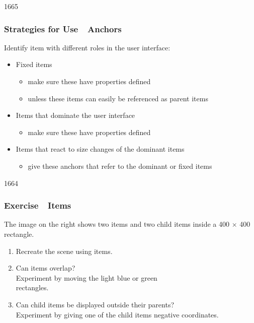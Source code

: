 
\begin{slide}{1665}\frametitle{Strategies for Use~\textendash~Anchors}

Identify item with different roles in the user interface:

\begin{itemize}
\item Fixed items
  \begin{itemize}
  \item make sure these have  properties defined
  \item unless these items can easily be referenced as parent items
  \end{itemize}
\item Items that dominate the user interface
  \begin{itemize}
  \item make sure these have  properties defined
  \end{itemize}
\item Items that react to size changes of the dominant items
  \begin{itemize}
  \item give these anchors that refer to the dominant or fixed items
  \end{itemize}
\end{itemize}

\end{slide}      


\begin{slide}{1664}\frametitle{Exercise~\textendash~Items}


The image on the right shows two items and two child items inside
a 400 $\times$ 400 rectangle.\\

\begin{enumerate}
\item Recreate the scene using  items.
\item Can items overlap?\\
{\small Experiment by moving the light blue or green\\
rectangles.}
\item Can child items be displayed outside their parents?\\
{\small Experiment by giving one of the child items negative coordinates.}
\end{enumerate}

\end{slide}

